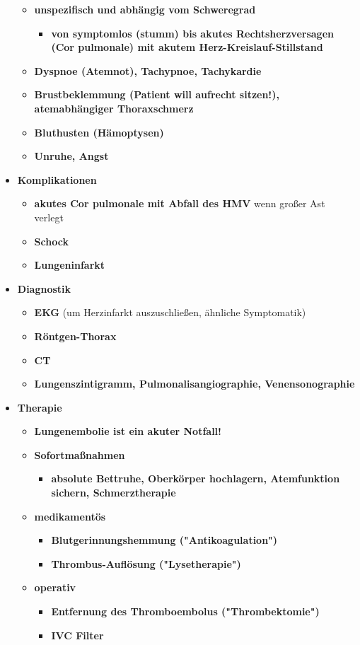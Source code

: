 \begin{itemize}
				\begin{itemize}
					\item \textbf{unspezifisch und abhängig vom Schweregrad}
						\begin{itemize}
							\item \textbf{von symptomlos (stumm) bis akutes Rechtsherzversagen (Cor pulmonale) mit akutem Herz-Kreislauf-Stillstand}
						\end{itemize}
					\item \textbf{Dyspnoe (Atemnot), Tachypnoe, Tachykardie}
					\item \textbf{Brustbeklemmung (Patient will aufrecht sitzen!), atemabhängiger Thoraxschmerz}
					\item \textbf{Bluthusten (Hämoptysen)}
					\item \textbf{Unruhe, Angst}
				\end{itemize}
			\item \textbf{Komplikationen}
				\begin{itemize}
					\item \textbf{akutes Cor pulmonale mit Abfall des HMV} wenn großer Ast verlegt
					\item \textbf{Schock}
					\item \textbf{Lungeninfarkt}
				\end{itemize}
			\item \textbf{Diagnostik}
				\begin{itemize}
					\item \textbf{EKG} (um Herzinfarkt auszuschließen, ähnliche Symptomatik)
					\item \textbf{Röntgen-Thorax}
					\item \textbf{CT}
					\item \textbf{Lungenszintigramm, Pulmonalisangiographie, Venensonographie}
				\end{itemize}
			\item \textbf{Therapie}
				\begin{itemize}
					\item \textbf{Lungenembolie ist ein akuter Notfall!}
					\item \textbf{Sofortmaßnahmen}
						\begin{itemize}
							\item \textbf{absolute Bettruhe, Oberkörper hochlagern, Atemfunktion sichern, Schmerztherapie}
						\end{itemize}
					\item \textbf{medikamentös}
						\begin{itemize}
							\item \textbf{Blutgerinnungshemmung ("Antikoagulation")}
							\item \textbf{Thrombus-Auflösung ("Lysetherapie")}
						\end{itemize}
					\item \textbf{operativ}
						\begin{itemize}
							\item \textbf{Entfernung des Thromboembolus ("Thrombektomie")}
							\item \textbf{IVC Filter}
						\end{itemize}
				\end{itemize}
		\end{itemize}
